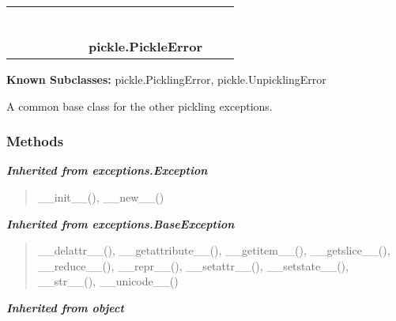     \label{pickle:PickleError}
\begin{tabular}{cccccccccc}
\multicolumn{2}{r}{\settowidth{\BCL}{object}\multirow{2}{\BCL}{object}}
&&
&&
&&
  \\\cline{3-3}
  &&\multicolumn{1}{c|}{}
&&
&&
&&
  \\
\multicolumn{4}{r}{\settowidth{\BCL}{exceptions.BaseException}\multirow{2}{\BCL}{exceptions.BaseException}}
&&
&&
  \\\cline{5-5}
  &&&&\multicolumn{1}{c|}{}
&&
&&
  \\
\multicolumn{6}{r}{\settowidth{\BCL}{exceptions.Exception}\multirow{2}{\BCL}{exceptions.Exception}}
&&
  \\\cline{7-7}
  &&&&&&\multicolumn{1}{c|}{}
&&
  \\
&&&&&&\multicolumn{2}{l}{\textbf{pickle.PickleError}}
\end{tabular}

\textbf{Known Subclasses:}
pickle.PicklingError,
    pickle.UnpicklingError

A common base class for the other pickling exceptions.



  \subsubsection{Methods}


\large{\textbf{\textit{Inherited from exceptions.Exception}}}

\begin{quote}
\_\_init\_\_(), \_\_new\_\_()
\end{quote}

\large{\textbf{\textit{Inherited from exceptions.BaseException}}}

\begin{quote}
\_\_delattr\_\_(), \_\_getattribute\_\_(), \_\_getitem\_\_(), \_\_getslice\_\_(), \_\_reduce\_\_(), \_\_repr\_\_(), \_\_setattr\_\_(), \_\_setstate\_\_(), \_\_str\_\_(), \_\_unicode\_\_()
\end{quote}

\large{\textbf{\textit{Inherited from object}}}

